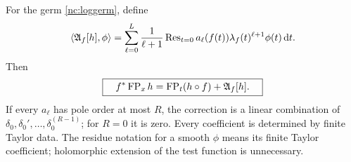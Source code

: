 \begin{theorem}
\label{nc:universal}
For the germ \eqref{nc:loggerm}, define
\begin{equation}\label{nc:residue-anomaly}
 \left\langle\mathfrak A_f[h],\phi\right\rangle
 =\sum_{\ell=0}^{L}\frac1{\ell+1}
  \operatorname{Res}_{t=0}
    a_\ell(f(t))\lambda_f(t)^{\ell+1}\phi(t)\,\mathrm d t.
\end{equation}
Then
\begin{equation}\label{nc:universal-law}
 \boxed{\quad
 f^*\operatorname{FP}_xh=\operatorname{FP}_t(h\circ f)+\mathfrak A_f[h].
 \quad}
\end{equation}
If every $a_\ell$ has pole order at most $R$, the correction is a
linear combination of
$\delta_0,\delta_0',\ldots,\delta_0^{(R-1)}$; for $R=0$ it is zero.
Every coefficient is determined by finite Taylor data. The residue
notation for a smooth $\phi$ means its finite Taylor coefficient;
holomorphic extension of the test function is unnecessary.
\end{theorem}

